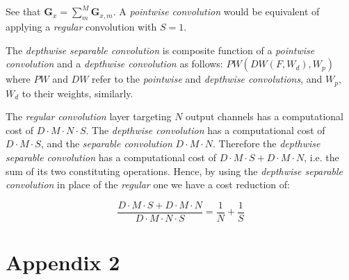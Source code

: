 See that $\mathbf{G}_{x} =  \sum_{m}^{M} \hat{\mathbf{G}}_{x, m}$. A \textit{pointwise convolution} would be equivalent of applying a \textit{regular} convolution with $S=1$.

The \textit{depthwise separable convolution} is composite function of a \textit{pointwise convolution} and a \textit{depthwise convolution} as follows: $PW(DW(F,W_{d}),W_{p})$ where $PW$ and $DW$ refer to the \textit{pointwise} and \textit{depthwise convolutions}, and $W_{p}$, $W_{d}$ to their weights, similarly.

The \textit{regular convolution} layer targeting $N$ output channels has a computational cost of $D \cdot M \cdot N \cdot S$. The \textit{depthwise convolution} has a computational cost of $D \cdot M \cdot S$,  and the \textit{separable convolution} $D \cdot M \cdot N$. Therefore the \textit{depthwise separable convolution} has a computational cost  of $D \cdot M  \cdot S + D \cdot M \cdot N$, i.e. the sum of its two constituting operations. Hence, by using the \textit{depthwise separable convolution} in place of the \textit{regular} one we have a cost reduction of:

$$ \frac{D \cdot M \cdot S  + D \cdot M \cdot N} {D \cdot M \cdot N \cdot S} = \frac{1}{N} + \frac{1}{S} $$


\newpage

\section*{Appendix 2}

